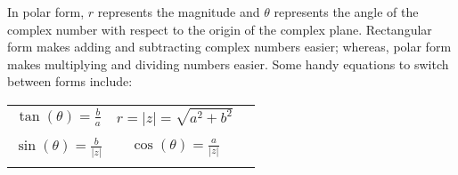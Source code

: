 In polar form, $r$ represents the magnitude and $\theta$ represents the angle of the complex number with respect to the origin of the complex plane.
Rectangular form makes adding and subtracting complex numbers easier; whereas, polar form makes multiplying and dividing numbers easier.
Some handy equations to switch between forms include:

\begin{center}

\begin{tabular}{ c c c }
 $\tan(\theta) = \frac{b}{a}$ & $r = |z| = \sqrt{a^2 + b^2}$ \\ \\
 $\sin(\theta) = \frac{b}{|z|}$ & $\cos(\theta) = \frac{a}{|z|}$ \\  \\
\end{tabular}

\end{center}

\vspace{-15px}

